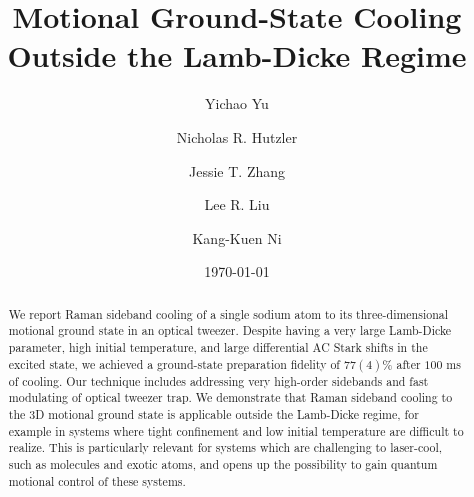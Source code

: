 \documentclass[aps,prl,twocolumn,groupedaddress]{revtex4-1}
\begin{document}
\title{Motional Ground-State Cooling Outside the Lamb-Dicke Regime}
\author{Yichao Yu}
\author{Nicholas R. Hutzler}
\author{Jessie T. Zhang}
\author{Lee R. Liu}
\author{Kang-Kuen Ni}

\date{\today}

\begin{abstract}
  We report Raman sideband cooling of a single sodium atom to its three-dimensional
  motional ground state in an optical tweezer.
  Despite having a very large Lamb-Dicke parameter, high initial temperature, and
  large differential AC Stark shifts in the excited state,
  we achieved a ground-state preparation fidelity of $77(4)$\% after $100$ ms of cooling.
  Our technique includes addressing very high-order sidebands and
  fast modulating of optical tweezer trap.
  We demonstrate that Raman sideband cooling to the 3D motional ground state is applicable
  outside the Lamb-Dicke regime, for example in
  systems where tight confinement and low initial temperature are difficult to realize.
  This is particularly relevant for systems which are challenging to laser-cool,
  such as molecules and exotic atoms,
  and opens up the possibility to gain quantum motional control of these systems.
\end{abstract}

\maketitle
\end{document}
